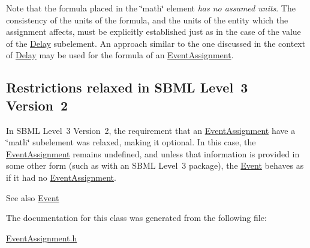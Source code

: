Note that the formula placed in the \char`\"{}math\char`\"{} element {\itshape has no assumed units}. The consistency of the units of the formula, and the units of the entity which the assignment affects, must be explicitly established just as in the case of the value of the \hyperlink{class_delay}{Delay} subelement. An approach similar to the one discussed in the context of \hyperlink{class_delay}{Delay} may be used for the formula of an \hyperlink{class_event_assignment}{Event\+Assignment}.\hypertarget{class_event_assignment_event-asnt-restrictions}{}\subsection{Restrictions relaxed in S\+B\+M\+L Level 3 Version 2}\label{class_event_assignment_event-asnt-restrictions}
In S\+B\+ML Level~3 Version~2, the requirement that an \hyperlink{class_event_assignment}{Event\+Assignment} have a \char`\"{}math\char`\"{} subelement was relaxed, making it optional. In this case, the \hyperlink{class_event_assignment}{Event\+Assignment} remains undefined, and unless that information is provided in some other form (such as with an S\+B\+ML Level~3 package), the \hyperlink{class_event}{Event} behaves as if it had no \hyperlink{class_event_assignment}{Event\+Assignment}.

\begin{DoxySeeAlso}{See also}
\hyperlink{class_event}{Event} 
\end{DoxySeeAlso}


The documentation for this class was generated from the following file\+:\begin{DoxyCompactItemize}
\item 
\hyperlink{_event_assignment_8h}{Event\+Assignment.\+h}\end{DoxyCompactItemize}

